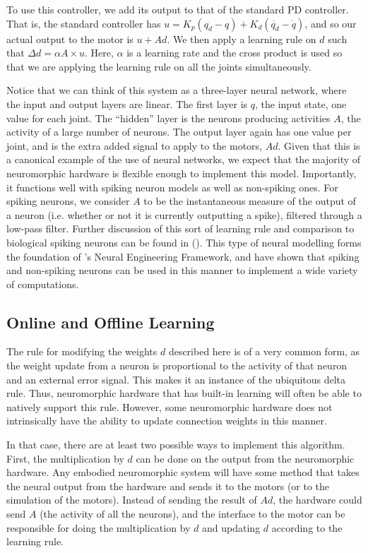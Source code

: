 \documentclass{frontiersSCNS} %
\begin{document}
To use this controller, we add its output to that of the standard PD controller.
That is, the standard controller has $u=K_p(q_d - q) + K_d(\dot{q_d} - \dot{q})$,
and so our actual output to the motor is $u + Ad$.  We then apply a learning
rule on $d$ such that $\Delta d = \alpha A \times u$.  Here, $\alpha$ is a learning
rate and the cross product is used so that we are applying the learning rule
on all the joints simultaneously.

Notice that we can think of this system as a three-layer neural
network, where the input and output layers are linear.  The first layer is $q$, the input state, one value for each joint.  The ``hidden'' layer
is the neurons producing activities $A$, the activity of a large number of neurons.  The output layer again has
one value per joint, and is the extra added signal to apply to the motors, $Ad$.
Given that this is a canonical example of the use of neural networks, we
expect that the majority of neuromorphic hardware is flexible enough to implement
this model.  Importantly, it functions well with spiking neuron models as 
well as non-spiking ones.  For spiking neurons, we consider $A$ to be the
instantaneous measure of the output of a neuron (i.e. whether or not it is currently outputting a spike),
filtered through a low-pass filter.  Further discussion of this sort of learning
rule and comparison to biological spiking neurons can be found in (\citealt{bekolay2013}).
This type of neural modelling forms the foundation of \cite{eliasmith2003}'s
Neural Engineering Framework, and \cite{stewart2014} have shown that spiking
and non-spiking neurons can be used in this manner to implement a wide
variety of computations.


\subsection{Online and Offline Learning}

The rule for modifying the weights $d$ described here is
of a very common form, as the weight
update from a neuron is proportional to the activity of that neuron and an
external error signal.  This makes it an instance of the ubiquitous delta rule.
Thus, neuromorphic hardware that has built-in learning will often be able to natively support this rule.
However, some neuromorphic hardware does not intrinsically have
the ability to update connection weights in this manner.

In that case, there are at least two possible ways to implement this algorithm.
First, the multiplication by $d$ can be done on the
output from the neuromorphic hardware.  Any embodied neuromorphic system will have some method that takes
the neural output from the hardware and sends it to the motors (or to the simulation
of the motors).  Instead of sending the result of $Ad$, the hardware could
send $A$ (the activity of all the neurons), and the interface to the motor
can be responsible for doing the multiplication by $d$ and updating $d$
according to the learning rule.
\end{document}

